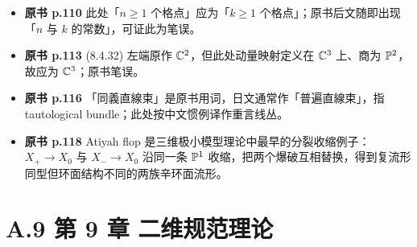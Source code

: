 \begin{itemize}[leftmargin=2.4em,itemsep=4pt,label={\textbullet}]
\item \textbf{原书 p.110} 此处「$n\ge 1$ 个格点」应为「$k\ge 1$ 个格点」；原书后文随即出现「$n$ 与 $k$ 的常数」，可证此为笔误。
\item \textbf{原书 p.113} (8.4.32) 左端原作 $\mathbb{C}^2$，但此处动量映射定义在 $\mathbb{C}^3$ 上、商为 $\mathbb{P}^2$，故应为 $\mathbb{C}^3$；原书笔误。
\item \textbf{原书 p.116} 「同義直線束」是原书用词，日文通常作「普遍直線束」，指 tautological bundle；此处按中文惯例译作重言线丛。
\item \textbf{原书 p.118} Atiyah flop 是三维极小模型理论中最早的分裂收缩例子：$X_+\to X_0$ 与 $X_-\to X_0$ 沿同一条 $\mathbb{P}^1$ 收缩，把两个爆破互相替换，得到复流形同型但环面结构不同的两族辛环面流形。
\end{itemize}

\section*{A.9 第 9 章 二维规范理论}
